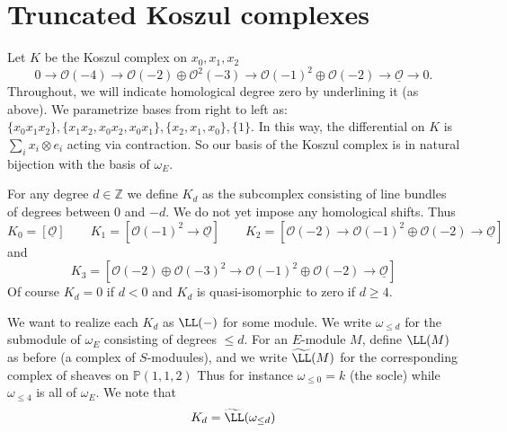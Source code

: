 \documentclass[12pt]{amsart}
\theoremstyle{definition}
\theoremstyle{remark}
\newcommand{\PP}{\mathbb P}
\newcommand{\ZZ}{\mathbb Z}
\newcommand{\Hom}{\operatorname{Hom}} %
\newcommand{\cO}{{\mathcal O}}
\newcommand{\daniel}[1]{{\color{blue} \sf $\clubsuit\clubsuit\clubsuit$ Daniel: [#1]}}
\begin{document}
%
%
%
%


\section{Truncated Koszul complexes}
Let $K$ be the Koszul complex on $x_0,x_1,x_2$
\[
0\to \cO(-4) \to \cO(-2) \oplus \cO^2(-3) \to \cO(-1)^2\oplus \cO(-2) \to \underline{\cO} \to  0.
\]
Throughout, we will indicate homological degree zero by underlining it (as above).  
We parametrize bases from right to left as:  $\{x_0x_1x_2\}, \{x_1x_2,x_0x_2,x_0x_1\},\{x_2,x_1,x_0\},  \{1\}$.  In this way, the differential on $K$ is $\sum_i x_i\otimes e_i$ acting via contraction.  So our basis of the Koszul complex is in natural bijection with the basis of $\omega_E$.

For any degree $d\in \ZZ$ we define $K_d$ as the subcomplex consisting of line bundles of degrees between $0$ and $-d$.
We do not yet impose any homological shifts.  Thus
\[
K_0 = [\underline{\cO}] \qquad K_1 = [\cO(-1)^2 \to \underline{\cO} ] \qquad K_2 = [\cO(-2) \to \cO(-1)^2\oplus\cO(-2) \to \underline{\cO} ] 
\] 
and
\[
K_3 =  [ \cO(-2)\oplus \cO(-3)^2 \to \cO(-1)^2 \oplus \cO(-2) \to \underline{\cO}] 
\]
Of course $K_d=0$ if $d<0$ and $K_d$ is quasi-isomorphic to zero if $d\geq 4$. 


We want to realize each $K_d$ as $\LL(-)$ for some module.  We write $\omega_{\leq d}$ for the submodule of $\omega_E$ consisting of degrees $\leq d$.  For an $E$-module $M$, define $\LL(M)$ as before (a complex of $S$-moduules), and we write $\widetilde{\LL}(M)$ for the corresponding complex of sheaves on $\PP(1,1,2)$
Thus for instance $\omega_{\leq 0 } = k$ (the socle) while $\omega_{\leq 4}$ is all of $\omega_E$.  We note that 
\[
K_d = \widetilde{\LL}(\omega_{\leq d})
\]
%
\end{document}
